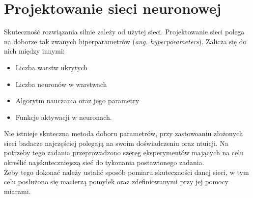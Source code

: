 \documentclass[12pt, a4paper, oneside]{article}
\begin{document}
	\section{Projektowanie sieci neuronowej}
	Skuteczność rozwiązania silnie zależy od użytej sieci. Projektowanie sieci polega na doborze tak zwanych hiperparametrów (\textit{ang. hyperparameters}). Zalicza się do nich między innymi:
	\begin{itemize}
		\item Liczba warstw ukrytych
		\item Liczba neuronów w warstwach
		\item Algorytm nauczania oraz jego parametry
		\item Funkcje aktywacji w neuronach.
	\end{itemize}

	Nie istnieje skuteczna metoda doboru parametrów, przy zastowoaniu złożonych sieci badacze najczęściej polegają na swoim doświadczeniu oraz ntuicji. Na potrzeby tego zadania przeprowadzono szereg eksperymentów mających na celu określić najskuteczniejszą sieć do tykonania postawionego zadania. \\
	
	Żeby tego dokonać należy ustalić sposób pomiaru skuteczności danej sieci, w tym celu posłużono się macierzą pomyłek oraz zdefiniowanymi przy jej pomocy miarami.
\end{document}
